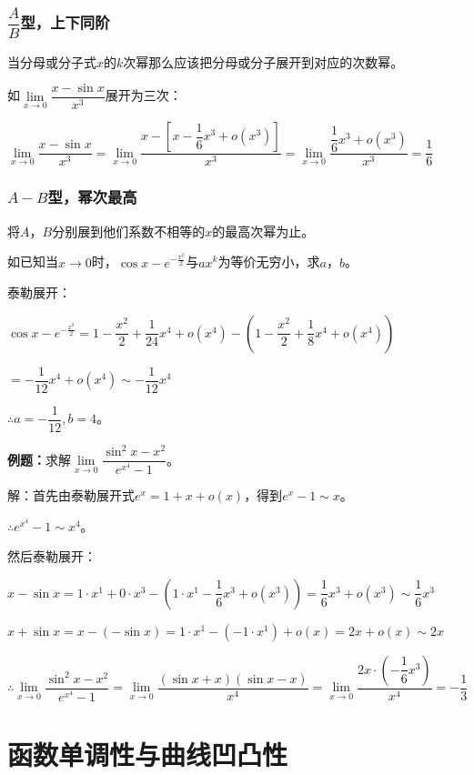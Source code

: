 \documentclass[UTF8, 12pt]{ctexart}
\begin{document}
\subsubsection{\texorpdfstring{$\dfrac{A}{B}$}\ 型，上下同阶}

当分母或分子式$x$的$k$次幂那么应该把分母或分子展开到对应的次数幂。\medskip

如$\lim\limits_{x\to 0}\dfrac{x-\sin x}{x^3}$展开为三次：\medskip

$\lim\limits_{x\to 0}\dfrac{x-\sin x}{x^3}=\lim\limits_{x\to 0}\dfrac{x-\left[x-\dfrac{1}{6}x^3+o(x^3)\right]}{x^3}=\lim\limits_{x\to 0}\dfrac{\dfrac{1}{6}x^3+o(x^3)}{x^3}=\dfrac{1}{6}$

\subsubsection{\texorpdfstring{$A-B$}\ 型，幂次最高}

将$A$，$B$分别展到他们系数不相等的$x$的最高次幂为止。

如已知当$x\to 0$时，$\cos x-e^{-\frac{x^2}{2}}$与$ax^k$为等价无穷小，求$a$，$b$。

泰勒展开：

$\cos x-e^{-\frac{x^2}{2}}= 1-\dfrac{x^2}{2}+\dfrac{1}{24}x^4+o(x^4)-\left(1-\dfrac{x^2}{2}+\dfrac{1}{8}x^4+o(x^4)\right)$

$=-\dfrac{1}{12}x^4+o(x^4)\sim -\dfrac{1}{12}x^4$

$\therefore a=-\dfrac{1}{12},b=4$。

\textbf{例题：}求解$\lim\limits_{x\to 0}\dfrac{\sin^2x-x^2}{e^{x^4}-1}$。

解：首先由泰勒展开式$e^x=1+x+o(x)$，得到$e^x-1\sim x$。

$\therefore e^{x^4}-1\sim x^4$。

然后泰勒展开：

$x-\sin x=1\cdot x^1+0\cdot x^3 - (1\cdot x^1-\dfrac{1}{6}x^3+o(x^3))= \dfrac{1}{6}x^3+o(x^3)\sim\dfrac{1}{6}x^3$

$x+\sin x=x-(-\sin x)=1\cdot x^1-(-1\cdot x^1)+o(x)=2x+o(x)\sim 2x$ \medskip

$\therefore\lim\limits_{x\to 0}\dfrac{\sin^2x-x^2}{e^{x^4}-1}=\lim\limits_{x\to 0}\dfrac{(\sin x+x)(\sin x-x)}{x^4}=\lim\limits_{x\to 0}\dfrac{2x\cdot\left(-\dfrac{1}{6}x^3\right)}{x^4}=-\dfrac{1}{3}$

\section{函数单调性与曲线凹凸性}
\end{document}
